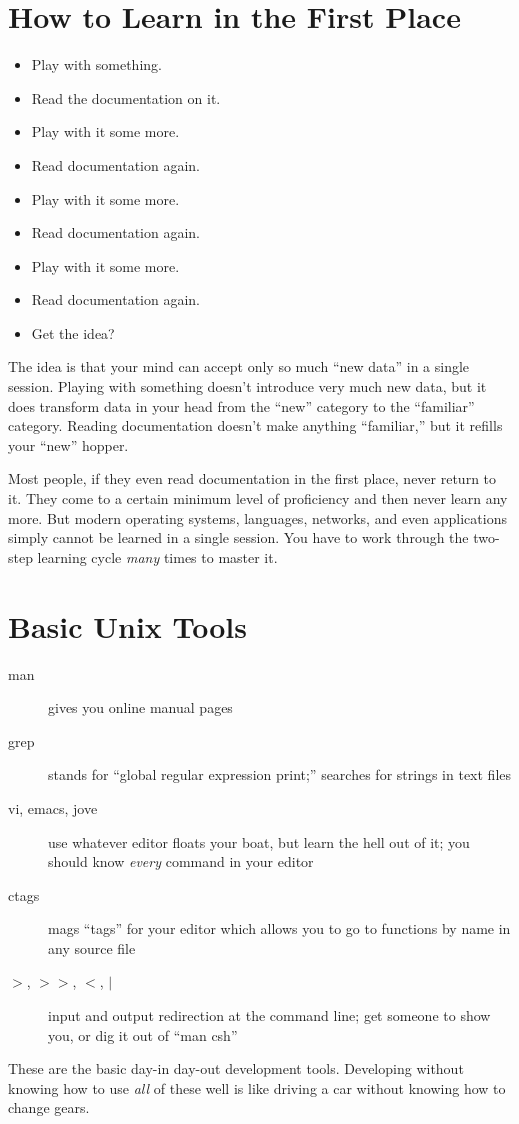 \documentclass{article}
\begin{document}
\section{How to Learn in the First Place}
\begin{itemize}
\item Play with something.
\item Read the documentation on it.
\item Play with it some more.
\item Read documentation again.
\item Play with it some more.
\item Read documentation again.
\item Play with it some more.
\item Read documentation again.
\item Get the idea?
\end{itemize}
The idea is that your mind can accept only so much ``new data'' in a single session.  Playing with something doesn't introduce very much new data, but it does transform data in your head from the ``new'' category to the ``familiar'' category.  Reading documentation doesn't make anything ``familiar,'' but it refills your ``new'' hopper.
\par
Most people, if they even read documentation in the first place, never return to it.  They come to a certain minimum level of proficiency and then never learn any more.  But modern operating systems, languages, networks, and even applications simply cannot be learned in a single
session.  You have to work through the two-step learning cycle {\em many} times to master it.

\section{Basic Unix Tools}
\begin{description}
\item[man] gives you online manual pages
\item[grep] stands for ``global regular expression print;'' searches for strings in text files
\item[vi, emacs, jove] use whatever editor floats your boat, but learn the hell out of it; you should know {\em every} command in your editor
\item[ctags] mags ``tags'' for your editor which allows you to go to functions by name in any source file
\item[$>$, $>>$, $<$, $|$] input and output redirection at the command line; get someone to show you, or dig it out of ``man csh''
\end{description}
These are the basic day-in day-out development tools.  Developing without knowing how to use {\em all} of these well is like driving a car without knowing how to change gears.
\end{document}
